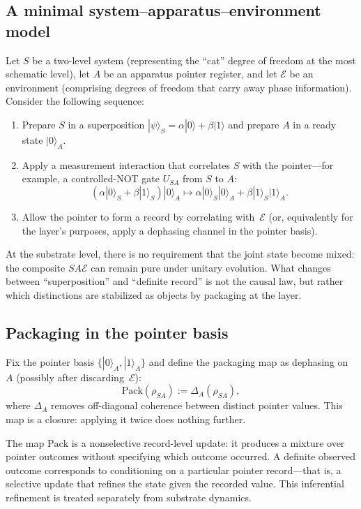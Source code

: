 \documentclass[11pt]{article}
\begin{document}
\subsection{A minimal system--apparatus--environment model}

Let $S$ be a two-level system (representing the ``cat'' degree of freedom at the most schematic level), let $A$ be an apparatus pointer register, and let $\mathcal{E}$ be an environment (comprising degrees of freedom that carry away phase information).
Consider the following sequence:
\begin{enumerate}
  \item Prepare $S$ in a superposition $|\psi\rangle_S = \alpha|0\rangle + \beta|1\rangle$ and prepare $A$ in a ready state $|0\rangle_A$.
  \item Apply a measurement interaction that correlates $S$ with the pointer---for example, a controlled-NOT gate $U_{SA}$ from $S$ to $A$:
  \[
  (\alpha|0\rangle_S+\beta|1\rangle_S)|0\rangle_A \mapsto \alpha|0\rangle_S|0\rangle_A + \beta|1\rangle_S|1\rangle_A.
  \]
  \item Allow the pointer to form a record by correlating with~$\mathcal{E}$ (or, equivalently for the layer's purposes, apply a dephasing channel in the pointer basis).
\end{enumerate}

At the substrate level, there is no requirement that the joint state become mixed: the composite $SA\mathcal{E}$ can remain pure under unitary evolution.
What changes between ``superposition'' and ``definite record'' is not the causal law, but rather which distinctions are stabilized as objects by packaging at the layer.

\subsection{Packaging in the pointer basis}

Fix the pointer basis $\{|0\rangle_A,|1\rangle_A\}$ and define the packaging map as dephasing on~$A$ (possibly after discarding~$\mathcal{E}$):
\[
\mathrm{Pack}(\rho_{SA}) := \Delta_A(\rho_{SA}),
\]
where $\Delta_A$ removes off-diagonal coherence between distinct pointer values.
This map is a closure: applying it twice does nothing further.

The map $\mathrm{Pack}$ is a nonselective record-level update: it produces a mixture over pointer outcomes without specifying which outcome occurred. A definite observed outcome corresponds to conditioning on a particular pointer record---that is, a selective update that refines the state given the recorded value. This inferential refinement is treated separately from substrate dynamics.
\end{document}
